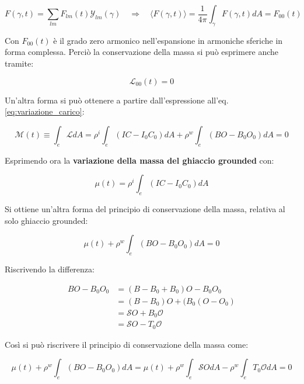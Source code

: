 \documentclass[a4paper,12pt]{book}
\begin{document}
\begin{equation}
    F(\gamma, t) = \sum_{lm} F_{lm} (t) \mathcal{Y}_{lm}(\gamma) \quad \Longrightarrow \quad \langle F(\gamma, t)\rangle = \frac{1}{4\pi} \int_\gamma F(\gamma, t) dA = F_{00}(t)
\end{equation}

\noindent
Con $F_{00}(t)$ è il grado zero armonico nell'espansione in armoniche sferiche in forma complessa.
Perciò la conservazione della massa si può esprimere anche tramite:

\begin{equation}
    \mathcal{L}_{00}(t)=0
\end{equation}

\noindent
Un'altra forma si può ottenere a partire dall'espressione all'eq. \ref{eq:variazione_carico}:

\begin{equation}
    \mathcal{M}(t) \equiv \int_e \mathcal{L}dA = \rho^i \int_e (IC - I_0C_0)dA + \rho^w \int_e (BO-B_0O_0)dA=0
\end{equation}

\noindent Esprimendo ora la \textbf{variazione della massa del ghiaccio grounded} con:

\begin{equation}
    \mu(t) = \rho^i \int_e (IC-I_0C_0)dA
\end{equation}

\noindent Si ottiene un'altra forma del principio di conservazione della massa, relativa al solo ghiaccio grounded:

\begin{equation}
    \mu(t) + \rho^w \int_e (BO-B_0O_0)dA = 0
\end{equation}

\noindent Riscrivendo la differenza:

\begin{align}
    BO-B_0O_0 &= (B-B_0+B_0)O-B_0O_0 \\ &= (B-B_0)O + (B_0(O-O_0) \\ &= \mathcal{S}O + B_0 \mathcal{O} \\ &= \mathcal{S}O - T_0\mathcal{O}
\end{align}

\noindent Così si può riscrivere il principio di conservazione della massa come:

\begin{equation}
    \mu(t) + \rho^w \int_e (BO - B_0O_0)dA = \mu(t) + \rho^w \int_e \mathcal{S}O dA - \rho^w \int_e T_0 \mathcal{O}dA = 0 
\end{equation}
\end{document}
